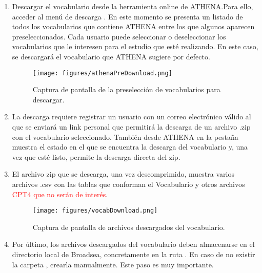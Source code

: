 \begin{enumerate}

    \item Descargar el vocabulario desde la herramienta online de  \href{https://athena.ohdsi.org/}{ATHENA}.Para ello, acceder al menú de descarga . En este momento se presenta un listado de todos los vocabularios que contiene ATHENA entre los que algunos aparecen preseleccionados. Cada usuario puede seleccionar o deseleccionar los vocabularios que le interesen para el estudio que esté realizando. En este caso, se descargará el vocabulario que ATHENA sugiere por defecto.
    
    \begin{figure}[H]
        \centering
        \texttt{[image: figures/athenaPreDownload.png]}
        \caption{Captura de pantalla de la preselección de vocabularios para descargar.}
        \label{fig:athenaPreDownload}
    \end{figure}

    \item La descarga requiere registrar un usuario con un correo electrónico válido al que se enviará un link personal que permitirá la descarga de un archivo .zip con el vocabulario seleccionado. También desde ATHENA en la pestaña  muestra el estado en el que se encuentra la descarga del vocabulario y, una vez que esté listo, permite la descarga directa del zip.

    \item El archivo zip que se descarga, una vez descomprimido, muestra varios archivos .csv con las tablas que conforman el Vocabulario y otros archivos \textcolor{red}{CPT4 que no serán de interés}. 

      \begin{figure}[H]
        \centering
        \texttt{[image: figures/vocabDownload.png]}
        \caption{Captura de pantalla de archivos descargados del vocabulario.}
        \label{fig:vocabDownload}
    \end{figure}

    \item Por último, los archivos descargados del vocabulario deben almacenarse en el directorio local de Broadsea, concretamente en la ruta . En caso de no existir la carpeta , crearla manualmente. Este paso es muy importante.

\end{enumerate}

